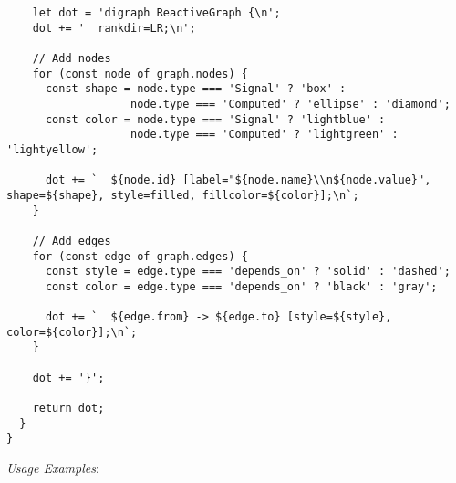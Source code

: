 \documentclass[11pt]{article}
\begin{document}
\begin{verbatim}
    let dot = 'digraph ReactiveGraph {\n';
    dot += '  rankdir=LR;\n';
    
    // Add nodes
    for (const node of graph.nodes) {
      const shape = node.type === 'Signal' ? 'box' : 
                   node.type === 'Computed' ? 'ellipse' : 'diamond';
      const color = node.type === 'Signal' ? 'lightblue' : 
                   node.type === 'Computed' ? 'lightgreen' : 'lightyellow';
      
      dot += `  ${node.id} [label="${node.name}\\n${node.value}", shape=${shape}, style=filled, fillcolor=${color}];\n`;
    }
    
    // Add edges
    for (const edge of graph.edges) {
      const style = edge.type === 'depends_on' ? 'solid' : 'dashed';
      const color = edge.type === 'depends_on' ? 'black' : 'gray';
      
      dot += `  ${edge.from} -> ${edge.to} [style=${style}, color=${color}];\n`;
    }
    
    dot += '}';
    
    return dot;
  }
}
\end{verbatim}

\emph{Usage Examples}:
\end{document}
